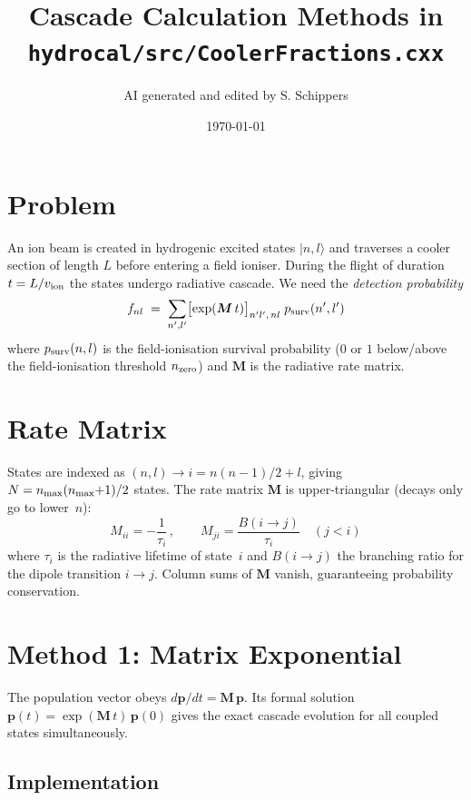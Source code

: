 \documentclass[11pt,a4paper]{article}
\newcommand{\bM}{\boldsymbol{M}}
\newcommand{\bp}{\boldsymbol{p}}
\begin{document}
\title{Cascade Calculation Methods in \texttt{hydrocal/src/CoolerFractions.cxx}}
\author{AI generated and edited by S. Schippers}
\date{\today}
\maketitle

\section{Problem}

An ion beam is created in hydrogenic excited states $|n,l\rangle$ and
traverses a cooler section of length $L$ before entering a field ioniser.
During the flight of duration $t = L/v_{\rm ion}$ the states undergo
radiative cascade.  We need the \emph{detection probability}
\begin{equation}
  f_{nl} \;=\; \sum_{n',l'} \bigl[\exp(\bM\, t)\bigr]_{n'l',\,nl}\;
  p_{\rm surv}(n',l')
  \label{eq:fnl}
\end{equation}
where $p_{\rm surv}(n,l)$ is the field-ionisation survival probability
($0$ or $1$ below/above the field-ionisation threshold $n_{\rm zero}$)
and $\bM$ is the radiative rate matrix.

\section{Rate Matrix}

States are indexed as $(n,l) \to i = n(n{-}1)/2 + l$, giving
$N = n_{\rm max}(n_{\rm max}{+}1)/2$ states.  The rate matrix $\bM$ is
upper-triangular (decays only go to lower~$n$):
\begin{equation}
  M_{ii} = -\frac{1}{\tau_i}\,, \qquad
  M_{ji} = \frac{B(i\!\to\!j)}{\tau_i} \quad(j < i)
\end{equation}
where $\tau_i$ is the radiative lifetime of state~$i$ and $B(i\!\to\!j)$
the branching ratio for the dipole transition $i\!\to\!j$.
Column sums of $\bM$ vanish, guaranteeing probability conservation.

\section{Method 1: Matrix Exponential}

The population vector obeys $d\bp/dt = \bM\,\bp$.  Its formal solution
$\bp(t) = \exp(\bM\,t)\,\bp(0)$ gives the exact cascade evolution for
all coupled states simultaneously.

\subsection{Implementation}
\end{document}
